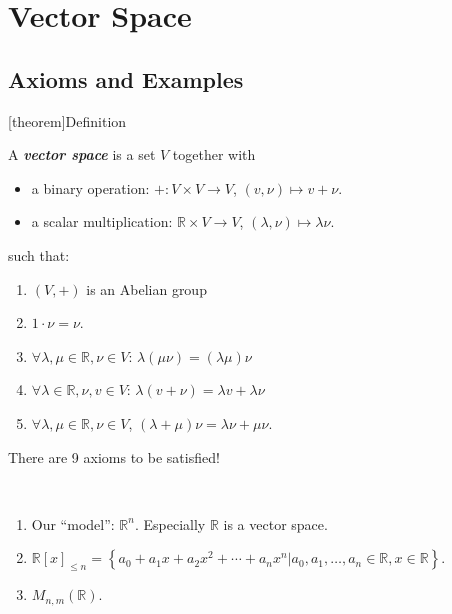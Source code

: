 \documentclass[12pt]{report}
\theoremstyle{definition}
\begin{document}
\section{Vector Space}

\subsection{Axioms and Examples}

[theorem]{Definition}
\begin{vector space}
    A \textbf{\emph{vector space}} is a set $V$ together with
                \begin{itemize}
                        \item a binary operation: $+:V\times V \rightarrow{} V$,
                            $(v, \nu) \mapsto v + \nu$.
                        \item a scalar multiplication: $\mathbb{R}\times V \rightarrow{} V$,
                            $(\lambda, \nu) \mapsto \lambda \nu$.
                \end{itemize}
              such that:
              \begin{enumerate}[label = (\arabic*)]
                  \item $(V,+)$ is an Abelian group
                  \item $1 \cdot \nu = \nu$.
                  \item $\forall \lambda, \mu \in \mathbb{R}, \nu \in V$:
                      $\lambda(\mu\nu) = (\lambda\mu)\nu$
                  \item $\forall \lambda \in \mathbb{R}, \nu,v \in V$:
                      $\lambda(v +\nu) = \lambda v + \lambda\nu$
                  \item $\forall \lambda, \mu \in \mathbb{R}, \nu \in V$,
                      $(\lambda + \mu)\nu = \lambda\nu + \mu\nu$.
              \end{enumerate}
              There are 9 axioms to be satisfied!
\end{vector space}

\begin{ex}
    \,

    \begin{enumerate}[label = (\arabic*)]
        \item Our ``model'': $\mathbb{R}^{n}$. Especially $\mathbb{R}$ is a vector space.

        \item 
            $\mathbb{R}{[x]}_{\le n} = \left\{a_0+ a_1x + a_2x^{2} + \cdots + a_n x^{n}
            |a_0, a_1,\ldots, a_n\in \mathbb{R}, x\in \mathbb{R}\right\} $.

        \item $M_{n,m}(\mathbb{R})$.
    \end{enumerate}
    
\end{ex}
\end{document}
